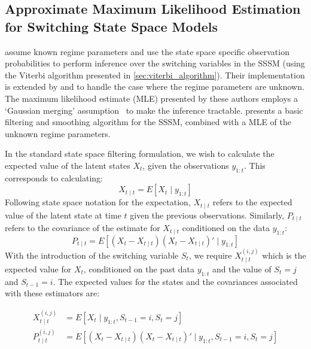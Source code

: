\subsection{Approximate Maximum Likelihood Estimation for Switching State Space Models}\label{sec:gaussian_merging}

\cite{shumway1991dynamic} assume known regime parameters and use the state space specific observation probabilities to perform inference over the switching variables in the SSSM (using the Viterbi algorithm presented in \ref{sec:viterbi_algorithm}). Their implementation is extended by \cite{kim1994dynamic, kim1999state} and \cite{bar1993estimation} to handle the case where the regime parameters are unknown. The maximum likelihood estimate (MLE) presented by these authors employs a `Gaussian merging' assumption~\citep{ghahramani2000variational} to make the inference tractable. \cite{kim1994dynamic} presents a basic filtering and smoothing algorithm for the SSSM, combined with a MLE of the unknown regime parameters.

In the standard state space filtering formulation, we wish to calculate the expected value of the latent states $X_t$, given the observations $y_{1:t}$. This corresponds to calculating:
\begin{equation}\label{eq:kim_ssm_expected_val}
  X_{t \mid t} = E[X_t \mid y_{1:t}]
\end{equation}
Following state space notation for the expectation, $X_{t \mid t}$ refers to the expected value of the latent state at time $t$ given the previous observations. Similarly, $P_{t \mid t}$ refers to the covariance of the estimate for $X_{t \mid t}$ conditioned on the data $y_{1:t}$:
\begin{equation}\label{eq:kim_ssm_covariance}
  P_{t \mid t} = E[(X_t - X_{t \mid t})(X_t - X_{t \mid t})' \mid y_{1:t}]
\end{equation}
With the introduction of the switching variable $S_t$, we require $X_{t \mid t}^{(i,j)}$ which is the expected value for $X_t$, conditioned on the past data $y_{1:t}$ and the value of $S_t = j$ and $S_{t-1} = i$. The expected values for the states and the covariances associated with these estimators are:

\begin{equation}\label{eq:kim_sssm_expected_val}
	\begin{split}
  X_{t \mid t}^{(i,j)} &= E[X_t \mid y_{1:t}, S_{t-1} = i, S_t = j] \\
  P_{t \mid t}^{(i,j)} &= E[(X_t - X_{t \mid t})(X_t - X_{t \mid t})' \mid y_{1:t}, S_{t-1} = i, S_t = j]
  	\end{split}
\end{equation}

